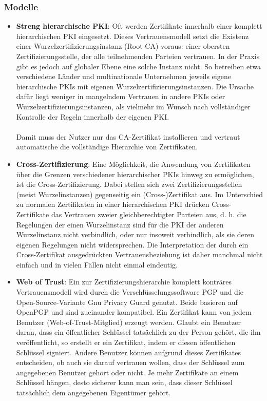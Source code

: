 \subsubsection{Modelle}

\begin{itemize}
\item \textbf{Streng hierarchische PKI}: Oft werden Zertifikate innerhalb einer komplett hierarchischen PKI eingesetzt. Dieses Vertrauensmodell setzt die Existenz einer Wurzelzertifizierungsinstanz (Root-CA) voraus: einer obersten Zertifizierungsstelle, der alle teilnehmenden Parteien vertrauen. In der Praxis gibt es jedoch auf globaler Ebene eine solche Instanz nicht. So betreiben etwa verschiedene Länder und multinationale Unternehmen jeweils eigene hierarchische PKIs mit eigenen Wurzelzertifizierungsinstanzen. Die Ursache dafür liegt weniger in mangelndem Vertrauen in andere PKIs oder Wurzelzertifizierungsinstanzen, als vielmehr im Wunsch nach vollständiger Kontrolle der Regeln innerhalb der eigenen PKI.\\\\
Damit muss der Nutzer nur das CA-Zertifikat installieren und vertraut automatische die vollständige Hierarchie von Zertifikaten.
\item \textbf{Cross-Zertifizierung}: Eine Möglichkeit, die Anwendung von Zertifikaten über die Grenzen verschiedener hierarchischer PKIs hinweg zu ermöglichen, ist die Cross-Zertifizierung. Dabei stellen sich zwei Zertifizierungsstellen (meist Wurzelinstanzen) gegenseitig ein (Cross-)Zertifikat aus. Im Unterschied zu normalen Zertifikaten in einer hierarchischen PKI drücken Cross-Zertifikate das Vertrauen zweier gleichberechtigter Parteien aus, d. h. die Regelungen der einen Wurzelinstanz sind für die PKI der anderen Wurzelinstanz nicht verbindlich, oder nur insoweit verbindlich, als sie deren eigenen Regelungen nicht widersprechen. Die Interpretation der durch ein Cross-Zertifikat ausgedrückten Vertrauensbeziehung ist daher manchmal nicht einfach und in vielen Fällen nicht einmal eindeutig.
\item \textbf{Web of Trust}: Ein zur Zertifizierungshierarchie komplett konträres Vertrauensmodell wird durch die Verschlüsselungssoftware PGP und die Open-Source-Variante Gnu Privacy Guard genutzt. Beide basieren auf OpenPGP und sind zueinander kompatibel. Ein Zertifikat kann von jedem Benutzer (Web-of-Trust-Mitglied) erzeugt werden. Glaubt ein Benutzer daran, dass ein öffentlicher Schlüssel tatsächlich zu der Person gehört, die ihn veröffentlicht, so erstellt er ein Zertifikat, indem er diesen öffentlichen Schlüssel signiert. Andere Benutzer können aufgrund dieses Zertifikates entscheiden, ob auch sie darauf vertrauen wollen, dass der Schlüssel zum angegebenen Benutzer gehört oder nicht. Je mehr Zertifikate an einem Schlüssel hängen, desto sicherer kann man sein, dass dieser Schlüssel tatsächlich dem angegebenen Eigentümer gehört.
\end{itemize}

